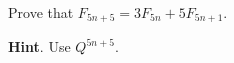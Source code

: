 \documentclass{book}
\begin{document}
\setcounter{cpjt}{169}
\addtocounter{cpjt}{-1}
\begin{activity}\label{activity-162}
\hypertarget{p-983}{}%
Prove that \(F_{5n + 5} = 3F_{5n} + 5F_{5n + 1}\).%
\par\smallskip%
\noindent\textbf{Hint}.\hypertarget{hint-112}{}\quad%
\hypertarget{p-984}{}%
Use \(Q^{5n + 5}\).%
\end{activity}

\clearpage
\end{document}
